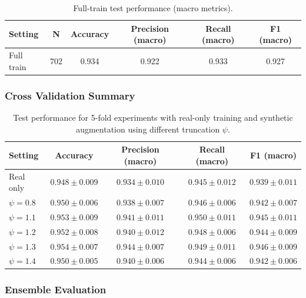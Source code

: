 \begin{table}[ht]
\centering
\caption{Full-train test performance (macro metrics).}
\begin{tabular}{lccccc}
\toprule
\textbf{Setting} & \textbf{N} & \textbf{Accuracy} & \textbf{Precision (macro)} & \textbf{Recall (macro)} & \textbf{F1 (macro)} \\
\midrule
Full train 
& 702 
& 0.934 
& 0.922 
& 0.933 
& 0.927 \\
\bottomrule
\end{tabular}
\label{tab:full_train_macro}
\end{table}


\subsubsection{Cross Validation Summary}

\begin{table}[H]
\centering
\caption{Test performance for 5-fold experiments with real-only training and synthetic augmentation using different truncation $\psi$.}
\label{tab:test_truncation}
\begin{tabular}{lcccc}
\toprule
Setting        & Accuracy           & Precision (macro)    & Recall (macro)       & F1 (macro)          \\
\midrule
Real only      & $0.948 \pm 0.009$  & $0.934 \pm 0.010$    & $0.945 \pm 0.012$    & $0.939 \pm 0.011$   \\
$\psi = 0.8$   & $0.950 \pm 0.006$  & $0.938 \pm 0.007$    & $0.946 \pm 0.006$    & $0.942 \pm 0.007$   \\
$\psi = 1.1$   & $0.953 \pm 0.009$  & $0.941 \pm 0.011$    & $0.950 \pm 0.011$    & $0.945 \pm 0.011$   \\
$\psi = 1.2$   & $0.952 \pm 0.008$  & $0.940 \pm 0.012$    & $0.948 \pm 0.006$    & $0.944 \pm 0.009$   \\
$\psi = 1.3$   & $0.954 \pm 0.007$  & $0.944 \pm 0.007$    & $0.949 \pm 0.011$    & $0.946 \pm 0.009$   \\
$\psi = 1.4$   & $0.950 \pm 0.005$  & $0.940 \pm 0.006$    & $0.944 \pm 0.006$    & $0.942 \pm 0.006$   \\
\bottomrule
\end{tabular}
\end{table}

\subsubsection{Ensemble Evaluation}

